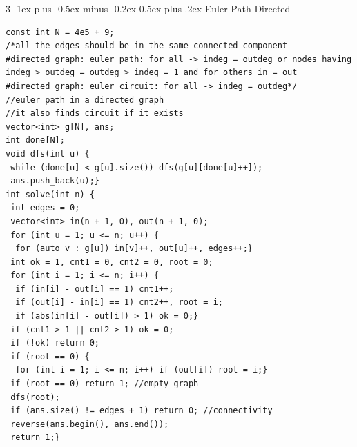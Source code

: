 \documentclass[8pt,a4paper,onesided]{article}
\makeatletter
\renewcommand{\subsection}{\@startsection{subsection}{2}{0mm}
    {-1ex plus -0.5ex minus -0.2ex} %
    {0.5ex plus .2ex}                %
    {\normalfont\large\bfseries}}    %
\makeatother
\begin{document}
\begin{multicols}{3}
\subsection{Euler Path Directed}
\begin{verbatim}
const int N = 4e5 + 9;
/*all the edges should be in the same connected component
#directed graph: euler path: for all -> indeg = outdeg or nodes having indeg > outdeg = outdeg > indeg = 1 and for others in = out
#directed graph: euler circuit: for all -> indeg = outdeg*/
//euler path in a directed graph
//it also finds circuit if it exists
vector<int> g[N], ans;
int done[N];
void dfs(int u) {
 while (done[u] < g[u].size()) dfs(g[u][done[u]++]);
 ans.push_back(u);}
int solve(int n) {
 int edges = 0;
 vector<int> in(n + 1, 0), out(n + 1, 0);
 for (int u = 1; u <= n; u++) {
  for (auto v : g[u]) in[v]++, out[u]++, edges++;}
 int ok = 1, cnt1 = 0, cnt2 = 0, root = 0;
 for (int i = 1; i <= n; i++) {
  if (in[i] - out[i] == 1) cnt1++;
  if (out[i] - in[i] == 1) cnt2++, root = i;
  if (abs(in[i] - out[i]) > 1) ok = 0;}
 if (cnt1 > 1 || cnt2 > 1) ok = 0;
 if (!ok) return 0;
 if (root == 0) {
  for (int i = 1; i <= n; i++) if (out[i]) root = i;}
 if (root == 0) return 1; //empty graph
 dfs(root);
 if (ans.size() != edges + 1) return 0; //connectivity
 reverse(ans.begin(), ans.end());
 return 1;}
\end{verbatim}

\end{multicols}
\end{document}
